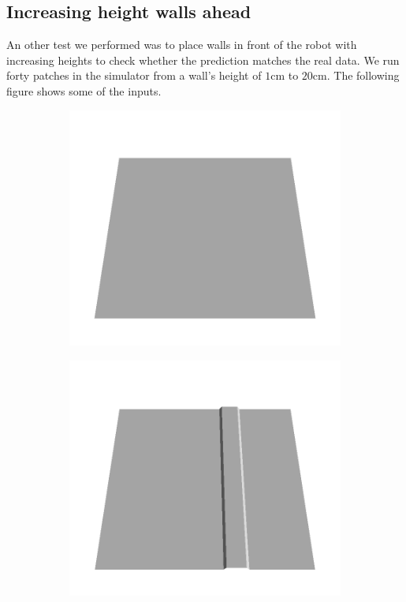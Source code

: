 \subsection{Increasing height walls ahead}
An other test we performed was to place walls in front of the robot with increasing heights to check whether the prediction matches the real data. We run forty patches in the simulator from a wall's height of $1$cm to $20$cm. The following figure shows some of the inputs.

\begin{figure}[H]
    \centering
    \begin{subfigure}[b]{0.24\textwidth}
    \includegraphics[width=\linewidth]{../img/5/custom_patches/walls_increasing/all/00-3d.png}
    \end{subfigure}
    \begin{subfigure}[b]{0.24\textwidth}
    \includegraphics[width=\linewidth]{../img/5/custom_patches/walls_increasing/all/03-3d.png}

\end{subfigure}
\end{figure}
